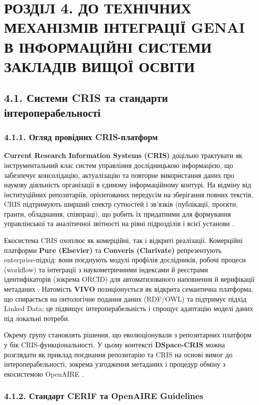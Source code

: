 \section*{РОЗДІЛ 4. ДО ТЕХНІЧНИХ МЕХАНІЗМІВ ІНТЕГРАЦІЇ GENAI В ІНФОРМАЦІЙНІ СИСТЕМИ ЗАКЛАДІВ ВИЩОЇ ОСВІТИ}

\subsection*{4.1. Системи CRIS та стандарти інтероперабельності}

\subsubsection*{4.1.1. Огляд провідних CRIS-платформ}

\textbf{Current Research Information Systems (CRIS)} доцільно трактувати як інструментальний клас систем управління дослідницькою інформацією, що забезпечує консолідацію, актуалізацію та повторне використання даних про наукову діяльність організації в єдиному інформаційному контурі. На відміну від інституційних репозитаріїв, орієнтованих передусім на зберігання повних текстів, CRIS підтримують ширший спектр сутностей і зв'язків (публікації, проєкти, гранти, обладнання, співпраці), що робить їх придатними для формування управлінської та аналітичної звітності на рівні підрозділів і всієї установи \cite{Bryant2017RIMDefining}.

Екосистема CRIS охоплює як комерційні, так і відкриті реалізації. Комерційні платформи \textbf{Pure (Elsevier)} та \textbf{Converis (Clarivate)} репрезентують enterprise-підхід: вони поєднують модулі профілів дослідників, робочі процеси (workflow) та інтеграції з наукометричними індексами й реєстрами ідентифікаторів (зокрема ORCID) для автоматизованого наповнення й верифікації метаданих \cite{ORCID2024APIDocs}. Натомість \textbf{VIVO} позиціонується як відкрита семантична платформа, що спирається на онтологічне подання даних (RDF/OWL) та підтримує підхід Linked Data; це підвищує інтероперабельність і спрощує адаптацію моделі даних під локальні потреби.

Окрему групу становлять рішення, що еволюціонували з репозитарних платформ у бік CRIS-функціональності. У цьому контексті \textbf{DSpace-CRIS} можна розглядати як приклад поєднання репозитарію та CRIS на основі вимог до інтероперабельності, зокрема узгодження метаданих і процедур обміну з екосистемою OpenAIRE \cite{OpenAIRE2023GuidelinesCRIS}.

\subsubsection*{4.1.2. Стандарт CERIF та OpenAIRE Guidelines}

